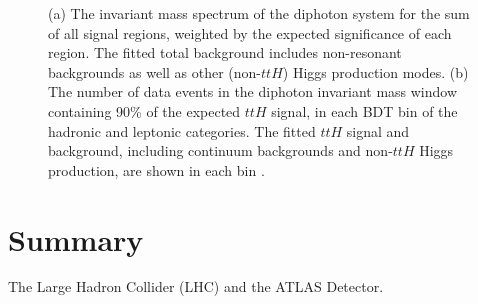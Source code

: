 \documentclass{moriond}
\begin{document}
\begin{figure}[!htbp]
  \centering
  \caption{
    (a) The invariant mass spectrum of the diphoton system for the sum of all signal regions, weighted
    by the expected significance of each region. The fitted total background includes non-resonant
    backgrounds as well as other (non-$ttH$) Higgs production modes.
    (b) The number of data events in the diphoton invariant mass window containing 90\% of the expected
    $ttH$ signal, in each BDT bin of the hadronic and leptonic categories.
    The fitted $ttH$ signal and background, including continuum backgrounds and non-$ttH$ Higgs
    production, are shown in each bin \cite{ATLAS-CONF-2019-004}.
  }
  \label{fig:tth}
\end{figure}



\section{Summary}

The Large Hadron Collider (LHC) \cite{Evans:2008zzb} and the ATLAS Detector.
\end{document}
